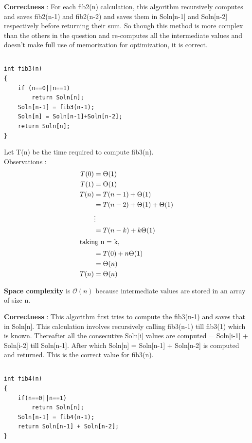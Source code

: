 \documentclass{article}
\begin{document}
\textbf{Correctness} : For each fib2(n) calculation, this algorithm recursively computes and saves fib2(n-1) and fib2(n-2) and saves them in Soln[n-1] and Soln[n-2] respectively before returning their sum. So though this method is more complex than the others in the question and re-computes all the intermediate values and doesn't make full use of memorization for optimization, it is correct.

\newpage
\subsection{}
\begin{lstlisting}
int fib3(n)
{
	if (n==0||n==1) 
		return Soln[n];
	Soln[n-1] = fib3(n-1);
	Soln[n] = Soln[n-1]+Soln[n-2];
	return Soln[n];
}
\end{lstlisting}

Let T(n) be the time required to compute fib3(n). \\
Observations : \\
\begin{align*}
T(0) & = \Theta(1) \\
T(1) & = \Theta(1) \\
T(n) & = T(n-1) + \Theta(1) \\
& = T(n-2) + \Theta(1) + \Theta(1) \\
& \vdots \\
& = T(n-k) + k\Theta(1) \\
\intertext{taking n = k,}
& = T(0) + n\Theta(1) \\
& = \Theta(n) \\
T(n) & = \Theta(n)\\
\end{align*}

\textbf{Space complexity} is $\mathcal{O}(n)$ because intermediate values are stored in an array of size n.

\textbf{Correctness} : This algorithm first tries to compute the fib3(n-1) and saves that in Soln[n]. This calculation involves recursively calling fib3(n-1) till fib3(1) which is known. Thereafter all the consecutive Soln[i] values are computed = Soln[i-1] + Soln[i-2] till Soln[n-1]. After which Soln[n] = Soln[n-1] + Soln[n-2] is computed and returned. This is the correct value for fib3(n).
\newpage
\subsection{}
\begin{lstlisting}
int fib4(n)
{
	if(n==0||n==1)
		return Soln[n];
	Soln[n-1] = fib4(n-1); 
	return Soln[n-1] + Soln[n-2];
}
\end{lstlisting}
\end{document}
